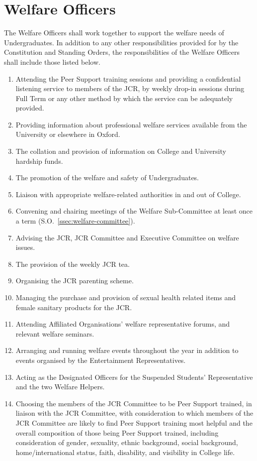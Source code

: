 \section{Welfare Officers}
\npara The Welfare Officers shall work together to support the welfare needs of Undergraduates.
\npara \label{resp:welfare-officers} In addition to any other responsibilities provided for by the Constitution and Standing Orders, the responsibilities of the Welfare Officers shall include those listed below.
\begin{enumerate}
	\item Attending the Peer Support training sessions and providing a confidential listening service to members of the JCR, by weekly drop-in sessions during Full Term or any other method by which the service can be adequately provided.
	\item Providing information about professional welfare services available from the University or elsewhere in Oxford.     
	\item The collation and provision of information on College and University hardship funds.     
	\item The promotion of the welfare and safety of Undergraduates.     
	\item Liaison with appropriate welfare-related authorities in and out of College.     
	\item Convening and chairing meetings of the Welfare Sub-Committee at least once a term (S.O.~\ref{ssec:welfare-committee}).     
	\item Advising the JCR, JCR Committee and Executive Committee on welfare issues.     
	\item The provision of the weekly JCR tea.     
	\item Organising the JCR parenting scheme.
	\item Managing the purchase and provision of sexual health related items and female sanitary products for the JCR.
	\item Attending Affiliated Organisations' welfare representative forums, and relevant welfare seminars.
	\item Arranging and running welfare events throughout the year in addition to events organised by the Entertainment Representatives.
	\item Acting as the Designated Officers for the Suspended Students’ Representative and the two Welfare Helpers.
	\item \label{SC:peer-choice} Choosing the members of the JCR Committee to be Peer Support trained, in liaison with the JCR Committee, with consideration to which members of the JCR Committee are likely to find Peer Support training most helpful and the overall composition of those being Peer Support trained, including consideration of gender, sexuality, ethnic background, social background,  home/international status, faith, disability, and visibility in College life.

\end{enumerate}
